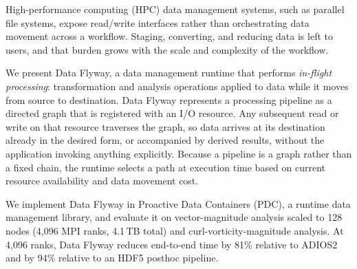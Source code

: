 High-performance computing (HPC) data management systems, such as parallel file systems, expose read/write interfaces rather than orchestrating data movement across a workflow. Staging, converting, and reducing data is left to users, and that burden grows with the scale and complexity of the workflow.

We present Data Flyway, a data management runtime that performs \emph{in-flight processing}: transformation and analysis operations applied to data while it moves from source to destination. Data Flyway represents a processing pipeline as a directed graph that is registered with an I/O resource. Any subsequent read or write on that resource traverses the graph, so data arrives at its destination already in the desired form, or accompanied by derived results, without the application invoking anything explicitly. Because a pipeline is a graph rather than a fixed chain, the runtime selects a path at execution time based on current resource availability and data movement cost.

We implement Data Flyway in Proactive Data Containers (PDC), a runtime data management library, and evaluate it on vector-magnitude analysis scaled to 128 nodes (4,096 MPI ranks, 4.1\,TB total) and curl-vorticity-magnitude analysis. At 4,096 ranks, Data Flyway reduces end-to-end time by 81\% relative to ADIOS2 and by 94\% relative to an HDF5 posthoc pipeline.